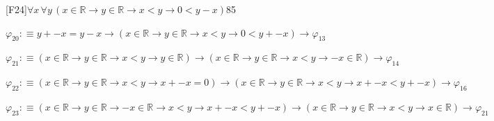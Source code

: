 \begin{fullproof}{[F24]}{$\forall x\,\forall y\,(x \in \mathbb{R} \to y \in \mathbb{R} \to x < y \to 0 < y - x)$}{85}
\begin{abbrevlist}
\item $\varphi_{20} :\equiv y + -x = y - x \to (x \in \mathbb{R} \to y \in \mathbb{R} \to x < y \to 0 < y + -x) \to \varphi_{13}$
\item $\varphi_{21} :\equiv (x \in \mathbb{R} \to y \in \mathbb{R} \to x < y \to y \in \mathbb{R}) \to (x \in \mathbb{R} \to y \in \mathbb{R} \to x < y \to -x \in \mathbb{R}) \to \varphi_{14}$
\item $\varphi_{22} :\equiv (x \in \mathbb{R} \to y \in \mathbb{R} \to x < y \to x + -x = 0) \to (x \in \mathbb{R} \to y \in \mathbb{R} \to x < y \to x + -x < y + -x) \to \varphi_{16}$
\item $\varphi_{23} :\equiv (x \in \mathbb{R} \to y \in \mathbb{R} \to -x \in \mathbb{R} \to x < y \to x + -x < y + -x) \to (x \in \mathbb{R} \to y \in \mathbb{R} \to x < y \to x \in \mathbb{R}) \to \varphi_{21}$
\end{abbrevlist}
\end{fullproof}
